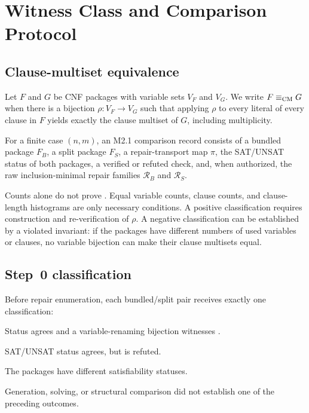 \section{Witness Class and Comparison Protocol}\label{sec:witness}

\subsection{Clause-multiset equivalence}

Let $F$ and $G$ be CNF packages with variable sets $V_F$ and $V_G$.
We write $F\equiv_{\mathrm{CM}} G$ when there is a bijection
$\rho:V_F\rightarrow V_G$ such that applying $\rho$ to every literal of every
clause in $F$ yields exactly the clause multiset of $G$, including
multiplicity.

\begin{definition}
For a finite case $(n,m)$, an M2.1 comparison record consists of a bundled
package $F_B$, a split package $F_S$, a repair-transport map $\pi$, the
SAT/UNSAT status of both packages, a verified or refuted \CM{} check, and, when
authorized, the raw inclusion-minimal repair families
$\mathcal{R}_B$ and $\mathcal{R}_S$.
\end{definition}

Counts alone do not prove \CM.  Equal variable counts, clause counts, and
clause-length histograms are only necessary conditions.  A positive
classification requires construction and re-verification of $\rho$.  A
negative classification can be established by a violated invariant: if the
packages have different numbers of used variables or clauses, no variable
bijection can make their clause multisets equal.

\subsection{Step~0 classification}

Before repair enumeration, each bundled/split pair receives exactly one
classification:
\begin{description}[style=nextline,leftmargin=2.2em]
  \item[\texttt{equiv\_cm\_persists}.]
  Status agrees and a variable-renaming bijection witnesses \CM.
  \item[\texttt{sat\_equiv\_only}.]
  SAT/UNSAT status agrees, but \CM{} is refuted.
  \item[\texttt{status\_diverges}.]
  The packages have different satisfiability statuses.
  \item[\texttt{inconclusive}.]
  Generation, solving, or structural comparison did not establish one of the
  preceding outcomes.
\end{description}

